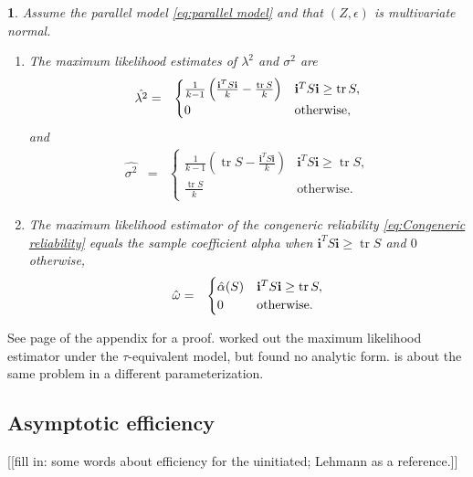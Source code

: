 \documentclass{article}
\makeatletter
\theoremstyle{plain}
\newtheorem{thm}{\protect\theoremname}
\theoremstyle{plain}
\theoremstyle{definition}
\theoremstyle{remark}
\theoremstyle{definition}
\theoremstyle{plain}
\theoremstyle{plain}
\theoremstyle{definition}
\newenvironment{proof}[1][\protect\proofname]{\par
	\normalfont\topsep6\p@\@plus6\p@\relax
	\trivlist
	\itemindent\parindent
	\item[\hskip\labelsep\scshape #1]\ignorespaces
}{%
	\endtrivlist\@endpefalse
}
\providecommand{\proofname}{Proof}
\providecommand{\theoremname}{Theorem}
\DeclareMathOperator{\tr}{tr}
\makeatother
\begin{document}
\begin{thm}\label{thm:ML}
Assume the parallel model \eqref{eq:parallel model} and that $(Z,\epsilon)$ is multivariate normal. 
\begin{enumerate}[label=(\roman*)]
\item The maximum likelihood estimates of $\lambda^{2}$
and $\sigma^{2}$ are 
\begin{eqnarray*}
\hat{\lambda^{2}} & = & \begin{cases}
\frac{1}{k-1}\left(\frac{\mathbf{i}^{T}S\mathbf{i}}{k}-\frac{\tr{S}}{k}\right) & \mathbf{i}^{T}S\mathbf{i}\geq\tr{S},\\
0 & \text{\textrm{otherwise}},
\end{cases}\\
\end{eqnarray*}
and
\begin{eqnarray*}
\hat{\sigma^{2}} & = & \begin{cases}
\frac{1}{k-1}\left(\tr{S}-\frac{\mathbf{i}^{T}S\mathbf{i}}{k}\right) & \mathbf{i}^{T}S\mathbf{i}\geq\tr{S},\\
\frac{\tr{S}}{k} & \textrm{otherwise}.
\end{cases}
\end{eqnarray*}
\item The maximum likelihood estimator of the congeneric reliability
\eqref{eq:Congeneric reliability} equals the sample coefficient alpha
when $\mathbf{i}^{T}S\mathbf{i}\geq\tr{S}$ and $0$ otherwise,
\begin{eqnarray*}
\hat{\omega} & = & \begin{cases}
\hat{\alpha}(S) & \mathbf{i}^{T}S\mathbf{i}\geq\tr{S},\\
0 & \text{\textrm{otherwise}}.
\end{cases}
\end{eqnarray*}
\end{enumerate}
\end{thm}
\begin{proof}
See page \pageref{proof:ML} of the appendix for a proof. \citet[][section 3 -- 5]{Kristof1969-ou} worked out the maximum likelihood estimator under the $\tau$-equivalent model, but found no analytic form. \citep[][Exercise 3.9, p. 114]{Muirhead2009-kq} is about the same problem in a different parameterization.
\end{proof}

\subsection{Asymptotic efficiency}
[[fill in: some words about efficiency for the uinitiated; Lehmann as a reference.]]
\end{document}
